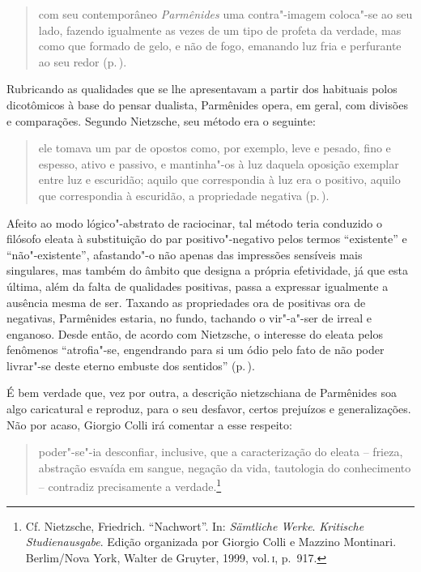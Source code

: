\begin{quote} 
com seu contemporâneo \textit{Parmênides} uma
 contra"-imagem coloca"-se ao seu lado, fazendo igualmente as vezes de um
 tipo de profeta da verdade, mas como que formado de gelo, e não de fogo,
 emanando luz fria e perfurante ao seu redor (p.\,\pageref{comseucontemporaneo}).
\end{quote} 

Rubricando as qualidades que se lhe apresentavam a partir dos habituais polos
dicotômicos à base do pensar dualista, Parmênides opera, em geral, com
divisões e comparações. Segundo Nietzsche, seu método era o seguinte: 

\begin{quote} 
ele tomava um par de opostos como, por exemplo, leve e
 pesado, fino e espesso, ativo e passivo, e mantinha"-os à luz daquela
 oposição exemplar entre luz e escuridão; aquilo que correspondia à luz era o
 positivo, aquilo que correspondia à escuridão, a propriedade negativa
 (p.\,\pageref{eletomavaumpar}).
\end{quote} 

Afeito ao modo lógico"-abstrato de raciocinar, tal método teria conduzido o
filósofo eleata à substituição do par positivo"-negativo pelos termos
``existente'' e ``não"-existente'', afastando"-o não apenas das impressões
sensíveis mais singulares, mas também do âmbito que designa a própria
efetividade, já que esta última, além da falta de qualidades positivas, passa
a expressar igualmente a ausência mesma de ser. Taxando as propriedades ora
de positivas ora de negativas, Parmênides estaria, no fundo, tachando o
vir"-a"-ser de irreal e enganoso. Desde então, de acordo com Nietzsche, o
interesse do eleata pelos fenômenos ``atrofia"-se, engendrando para si um
ódio pelo fato de não poder livrar"-se deste eterno embuste dos sentidos''
(p.\,\pageref{odio}).

É bem verdade que, vez por outra, a descrição nietzschiana de Parmênides soa
algo caricatural e reproduz, para o seu desfavor, certos prejuízos e
generalizações. Não por acaso, Giorgio Colli irá comentar a esse respeito: 

\begin{quote} 
poder"-se"-ia desconfiar, inclusive, que a caracterização
 do	\label{colli} eleata -- frieza, abstração esvaída em sangue, negação da
 vida, tautologia do conhecimento -- contradiz precisamente a
 verdade.\footnote{ Cf. Nietzsche, Friedrich. ``Nachwort''. In:
\textit{Sämtliche Werke}. \textit{\mbox{Kritische} Studienausgabe}. Edição
 organizada por Giorgio Colli e Mazzino Montinari. Berlim/Nova York, Walter
 de Gruyter, 1999, vol.\,\textsc{i}, p.~917.} 
\end{quote} 


